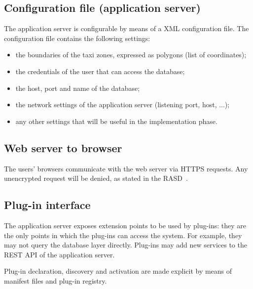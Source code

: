 \subsection{Configuration file (application server)}
\label{sec:config-file}
The application server is configurable by means of a XML configuration file.
The configuration file contains the following settings:
\begin{itemize}
    \item the boundaries of the taxi zones, expressed as polygons (list of coordinates);
    \item the credentials of the user that can access the database;
    \item the host, port and name of the database;
    \item the network settings of the application server (listening port, host, ...);
    \item any other settings that will be useful in the implementation phase.
\end{itemize}

\subsection{Web server to browser}
\label{sec:server-to-browser}
The users' browsers communicate with the web server via HTTPS requests. Any unencrypted request will be denied, as stated in the RASD~\cite{rasd}.

\subsection{Plug-in interface}
\label{sec:plug-in-interface}
The application server exposes extension points to be used by plug-ins: they are the only points in which the plug-ins can access the system. For example, they may not query the database layer directly.
Plug-ins may add new services to the REST API of the application server.

Plug-in declaration, discovery and activation are made explicit by means of manifest files and plug-in registry.
